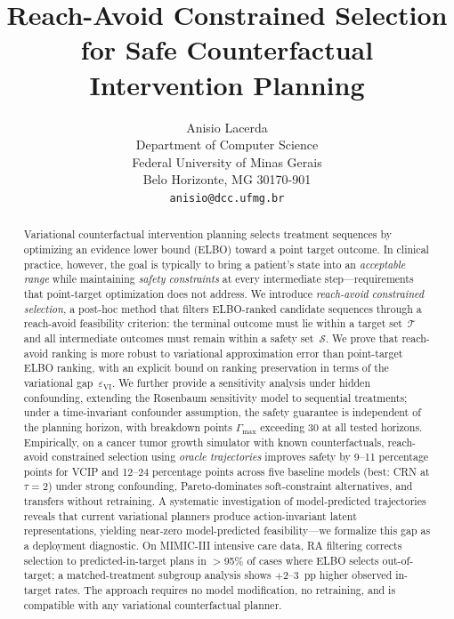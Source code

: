 \documentclass{article}
\title{Reach-Avoid Constrained Selection for Safe Counterfactual Intervention Planning}
\author{%
  Anisio Lacerda \\
  Department of Computer Science\\
  Federal University of Minas Gerais\\
  Belo Horizonte, MG 30170-901 \\
  \texttt{anisio@dcc.ufmg.br} \\
}
\newcommand{\cT}{\mathcal{T}}
\newcommand{\cS}{\mathcal{S}}
\begin{document}
\maketitle

\begin{abstract}
Variational counterfactual intervention planning selects treatment sequences by optimizing an evidence lower bound (ELBO) toward a point target outcome. In clinical practice, however, the goal is typically to bring a patient's state into an \emph{acceptable range} while maintaining \emph{safety constraints} at every intermediate step---requirements that point-target optimization does not address. We introduce \emph{reach-avoid constrained selection}, a post-hoc method that filters ELBO-ranked candidate sequences through a reach-avoid feasibility criterion: the terminal outcome must lie within a target set~$\cT$ and all intermediate outcomes must remain within a safety set~$\cS$. We prove that reach-avoid ranking is more robust to variational approximation error than point-target ELBO ranking, with an explicit bound on ranking preservation in terms of the variational gap~$\varepsilon_{\mathrm{VI}}$. We further provide a sensitivity analysis under hidden confounding, extending the Rosenbaum sensitivity model to sequential treatments; under a time-invariant confounder assumption, the safety guarantee is independent of the planning horizon, with breakdown points $\Gamma_{\max}$ exceeding $30$ at all tested horizons. Empirically, on a cancer tumor growth simulator with known counterfactuals, reach-avoid constrained selection using \emph{oracle trajectories} improves safety by 9--11 percentage points for VCIP and 12--24 percentage points across five baseline models (best: CRN at $\tau = 2$) under strong confounding, Pareto-dominates soft-constraint alternatives, and transfers without retraining. A systematic investigation of model-predicted trajectories reveals that current variational planners produce action-invariant latent representations, yielding near-zero model-predicted feasibility---we formalize this gap as a deployment diagnostic. On MIMIC-III intensive care data, RA filtering corrects selection to predicted-in-target plans in $>$95\% of cases where ELBO selects out-of-target; a matched-treatment subgroup analysis shows $+$2--3~pp higher observed in-target rates. The approach requires no model modification, no retraining, and is compatible with any variational counterfactual planner.
\end{abstract}


\end{document}
